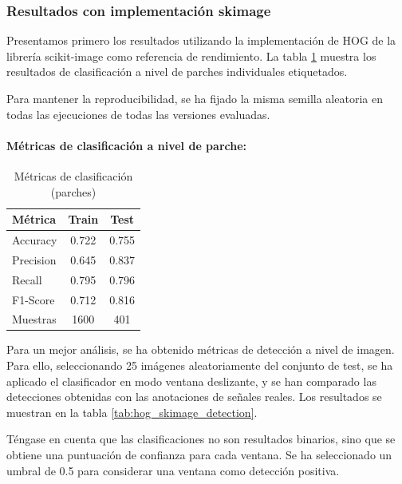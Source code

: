 \documentclass[11pt,a4paper]{article}
\begin{document}
\subsubsection{Resultados con implementación skimage}

Presentamos primero los resultados utilizando la implementación de HOG de la 
librería scikit-image como referencia de rendimiento. La tabla \ref{tab:hog_skimage_patch}
muestra los resultados de clasificación a nivel de parches individuales etiquetados.

Para mantener la reproducibilidad, se ha fijado la misma semilla aleatoria en todas las ejecuciones
de todas las versiones evaluadas.

\paragraph{Métricas de clasificación a nivel de parche:}
\begin{table}[H]
    \centering
    \caption{Métricas de clasificación (parches)}
    \label{tab:hog_skimage_patch}
    \begin{tabular}{lcc}
        \toprule
        \textbf{Métrica} & \textbf{Train} & \textbf{Test} \\
        \midrule
        Accuracy & 0.722 & 0.755 \\
        Precision &  0.645 & 0.837\\
        Recall & 0.795 & 0.796\\
        F1-Score & 0.712 & 0.816 \\
        Muestras & 1600 & 401 \\
        \bottomrule
    \end{tabular}
\end{table}

Para un mejor análisis, se ha obtenido métricas de detección a nivel de imagen.
Para ello, seleccionando 25 imágenes aleatoriamente del conjunto de test, se ha aplicado
el clasificador en modo ventana deslizante, y se han comparado las detecciones
obtenidas con las anotaciones de señales reales. Los resultados se muestran en la tabla
\ref{tab:hog_skimage_detection}.

Téngase en cuenta que las clasificaciones no son resultados binarios,
sino que se obtiene una puntuación de confianza para cada ventana.
Se ha seleccionado un umbral de 0.5 para considerar una ventana como detección positiva.
\end{document}
